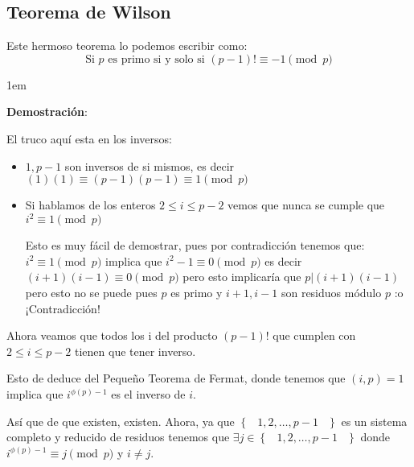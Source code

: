 \documentclass[12pt, fleqn]{report}                             %
\newenvironment{SmallIndentation}[1][0.75em]                    %
    {\begin{adjustwidth}{#1}{}\begin{footnotesize}}                 %
    {\end{footnotesize}\end{adjustwidth}}                           %
\DeclareMathOperator \Space {\quad}                             %
\DeclareMathOperator \MiniSpace {\;}                            %
\newcommand{\Set}[1]{\left\{ \MiniSpace #1 \MiniSpace \right\}} %
\begin{document}
        \subsection{Teorema de Wilson}

            Este hermoso teorema lo podemos escribir como:
            \begin{equation}
                \text{Si $p$ es primo si y solo si } (p-1)! \equiv -1 \pmod{p}
            \end{equation}


            \begin{SmallIndentation}[1em]
                \textbf{Demostración}:

                El truco aquí esta en los inversos:

                \begin{itemize}
                    \item $1, p-1$ son inversos de si mismos, es decir
                        $(1)(1) \equiv (p-1)(p-1) \equiv 1 \pmod{p}$

                    \item Si hablamos de los enteros $2 \leq i \leq p-2$ vemos que 
                        nunca se cumple que $i^2 \equiv 1 \pmod{p}$

                        Esto es muy fácil de demostrar, pues por contradicción tenemos
                        que: $i^2 \equiv 1 \pmod{p}$ implica que $i^2 - 1\equiv 0 \pmod{p}$
                        es decir $(i+1)(i-1) \equiv 0 \pmod{p}$ pero esto implicaría que
                        $p | (i+1)(i-1)$ pero esto no se puede pues $p$ es primo y 
                        $i+1, i-1$ son residuos módulo $p$ :o ¡Contradicción!

                \end{itemize}


                Ahora veamos que todos los i del producto $(p-1)!$ que cumplen
                con $2 \leq i \leq p-2$ tienen que tener inverso.

                Esto de deduce del Pequeño Teorema de Fermat, donde tenemos
                que $(i, p) = 1$ implica que $i^{\phi(p)-1}$ es el inverso de $i$.

                Así que de que existen, existen.
                Ahora, ya que $\Set{1, 2, \dots, p-1}$ es un sistema completo y reducido
                de residuos tenemos que $\exists j \in \Set{1, 2, \dots, p-1}$ donde
                $i^{\phi(p)-1} \equiv j \pmod{p}$ y $i \neq j$.


\end{SmallIndentation}
\end{document}
